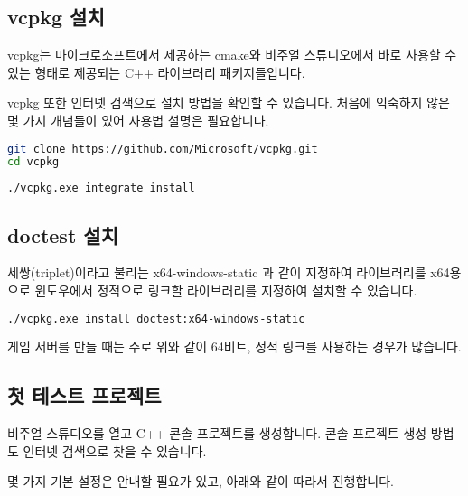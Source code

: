 \subsection{vcpkg 설치}

vcpkg는 마이크로소프트에서 제공하는 cmake와 비주얼 스튜디오에서 바로 사용할 수 있는 
형태로 제공되는 C++ 라이브러리 패키지들입니다. 

vcpkg 또한 인터넷 검색으로 설치 방법을 확인할 수 있습니다. 처음에 익숙하지 않은 
몇 가지 개념들이 있어 사용법 설명은 필요합니다. 

\begin{lstlisting}[language=bash, caption={vcpkg 받기}]
git clone https://github.com/Microsoft/vcpkg.git
cd vcpkg
\end{lstlisting}

\begin{lstlisting}[language=bash, caption={비주얼 스튜디오 연동하기}]
./vcpkg.exe integrate install
\end{lstlisting}

\subsection{doctest 설치}

세쌍(triplet)이라고 불리는 x64-windows-static 과 같이 지정하여 라이브러리를 x64용으로
윈도우에서 정적으로 링크할 라이브러리를 지정하여 설치할 수 있습니다. 

\begin{lstlisting}[language=bash, caption={doctest 64비트 정적 라이브러리 설치}]
    ./vcpkg.exe install doctest:x64-windows-static
\end{lstlisting}
    
게임 서버를 만들 때는 주로 위와 같이 64비트, 정적 링크를 사용하는 경우가 많습니다. 

\subsection{첫 테스트 프로젝트}

비주얼 스튜디오를 열고 C++ 콘솔 프로젝트를 생성합니다. 콘솔 프로젝트 생성 방법도 
인터넷 검색으로 찾을 수 있습니다. 

몇 가지 기본 설정은 안내할 필요가 있고, 아래와 같이 따라서 진행합니다. 










